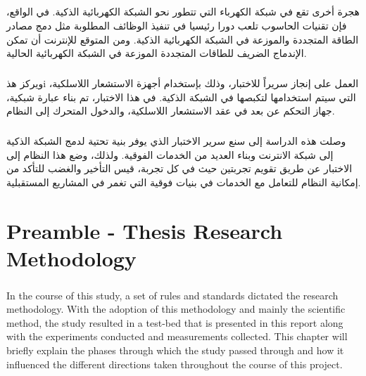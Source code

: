 \documentclass[12pt,a4paper,final]{report}
\begin{document}
\paragraph{}
\begin{arabtex}
هجرة أخرى تقع في شبكة الكهرباء التي تتطور نحو الشبكة الكهربائية الذكية. في الواقع، فإن تقنيات الحاسوب تلعب دورا رئيسيا في تنفيذ الوظائف المطلوبة مثل دمج مصادر الطاقة المتجددة والموزعة في الشبكة الكهربائية الذكية. ومن المتوقع للإنترنت أن تمكن الإندماج الضريف للطاقات المتجددة الموزعة في الشبكة الكهربائية الحالية.
\end{arabtex}
\paragraph{}
\begin{arabtex}
ويركز هذi العمل على إنجاز سريراً للاختبار، وذلك بإستخدام أجهزة الاستشعار اللاسلكية، التي سيتم استخدامها لتكبصها في الشبكة الذكية. في هذا الاختبار، تم بناء عبارة شبكية، جهاز التحكم عن بعد في عقد الاستشعار اللاسلكية، والدخول المتحرك إلى النظام.
\end{arabtex}
\paragraph{}
\begin{arabtex}
وصلت هذه الدراسة إلى سنع سرير الاختبار الذي يوفر بنية تحتية لدمج الشبكة الذكية إلى شبكة الانترنت وبناء العديد من الخدمات الفوقية. ولذلك، وضع هذا النظام إلى الاختبار عن طريق تقويم تجربتين حيث في كل تجربة، قيس التأخير والغضب للتأكد من إمكانية النظام للتعامل مع الخدمات في بنيات فوقية التي تغمر في المشاريع المستقبلية.
\end{arabtex}
\singlespacing

\tableofcontents
\listoffigures
\listoftables
\printglossaries


\doublespacing
\chapter{Preamble - Thesis Research Methodology}
\setcounter{page}{1}
\paragraph{}
 In the course of this study, a set of rules and standards dictated the research methodology. With the adoption of this methodology and mainly the scientific method, the study resulted in a test-bed that is presented in this report along with the experiments conducted and measurements collected. This chapter will briefly explain the phases through which the study passed through and how it influenced the different directions taken throughout the course of this project.
\end{document}

